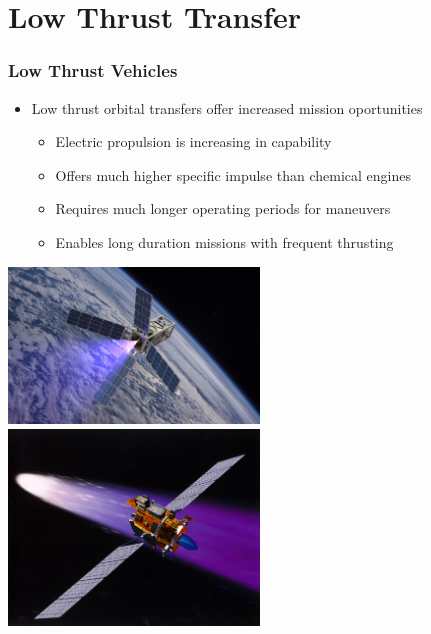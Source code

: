 
\section{Low Thrust Transfer}

\begin{frame} \label{slide:lowthrust_vehicles}%
\frametitle{Low Thrust Vehicles} %
\begin{itemize}
    \item Low thrust orbital transfers offer increased mission oportunities
    \begin{itemize}
        \item Electric propulsion is increasing in capability
        \item Offers much higher specific impulse than chemical engines 
        \item Requires much longer operating periods for maneuvers 
        \item Enables long duration missions with frequent thrusting
    \end{itemize}
\end{itemize}

\begin{center}
    \includegraphics[height=0.4\textheight,width=0.5\textwidth,keepaspectratio]{figures/defense/patriot_plume.jpg}
    ~
    \includegraphics[height=0.4\textheight,width=0.5\textwidth,keepaspectratio]{figures/defense/deepspace1.jpg}
\end{center}
\hyperlink{slide:propulsion}{}
\end{frame}   %

